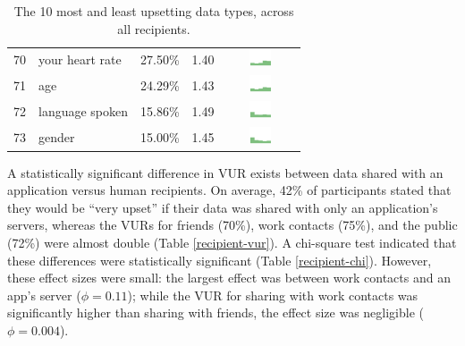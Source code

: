 \documentclass[conference]{IEEEtran}
\begin{document}
\begin{table}[t]
\begin{center}
\begin{tabular}{| r | l | r | r |c |}
70 & your heart rate & 27.50\% & 1.40 & \includegraphics[width = 2cm, height = 0.5cm]{tex-inputs/data10/learnedyourheartratecombined} \\
71 & age & 24.29\% & 1.43 & \includegraphics[width = 2cm, height = 0.5cm]{tex-inputs/data10/learnedyouragecombined}\\
72 & language spoken & 15.86\% & 1.49 & \includegraphics[width = 2cm, height = 0.5cm]{tex-inputs/data10/learnedthelanguageyouwerespeakingcombined}\\
73 & gender & 15.00\% & 1.45 & \includegraphics[width = 2cm, height = 0.5cm]{tex-inputs/data10/learnedyourgendercombined}\\ 
\hline
\end{tabular}
\caption{The 10 most and least upsetting data types, across all recipients.}
\label{top10-table}
\end{center}
\end{table}


A statistically significant difference in VUR exists between data shared with an application versus human recipients. On average, 42\% of participants stated that they would be ``very upset'' if their data was shared with only an application's servers, whereas the VURs for friends (70\%), work contacts (75\%), and the public (72\%) were almost double (Table \ref{recipient-vur}). A chi-square test indicated that these differences were statistically significant (Table \ref{recipient-chi}). However, these effect sizes were small: the largest effect was between work contacts and an app's server ($\phi=0.11$); while the VUR for sharing with work contacts was significantly higher than sharing with friends, the effect size was negligible ($\phi=0.004$). 
\end{document}
